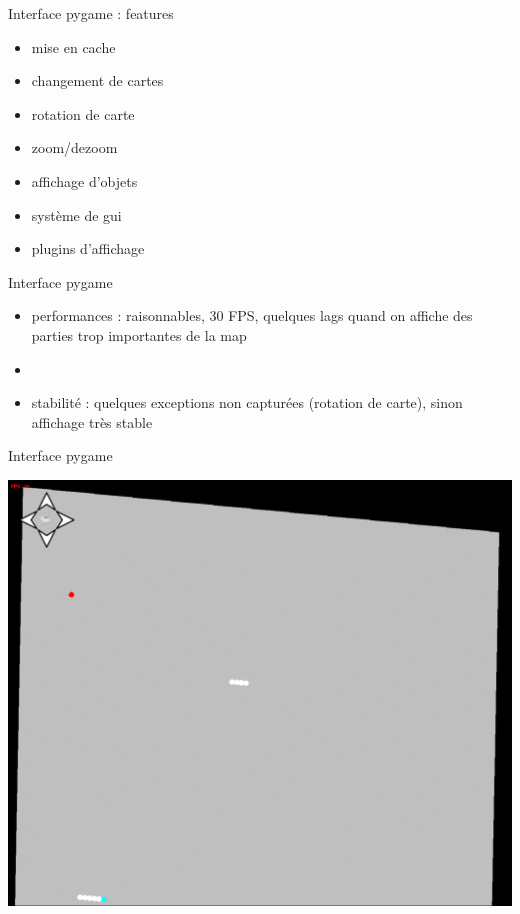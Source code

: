 \documentclass[11pt]{beamer}
\begin{document}
\begin{frame}{Interface pygame : features}
	\begin{itemize}
		\item mise en cache
    \item changement de cartes
    \item rotation de carte
    \item zoom/dezoom
    \item affichage d'objets
    \item système de gui
    \item plugins d'affichage
	\end{itemize}
\end{frame}

\begin{frame}{Interface pygame}
	\begin{itemize}
    \item performances : raisonnables, 30 FPS, quelques lags quand on affiche des parties trop importantes de la map
		\item[]
    \item stabilité : quelques exceptions non capturées (rotation de carte), sinon affichage très stable
	\end{itemize}
\end{frame}

\begin{frame}{Interface pygame}
	\begin{center}\includegraphics[scale=0.2]{game_screenshot.png}\end{center}
\end{frame}
\end{document}
